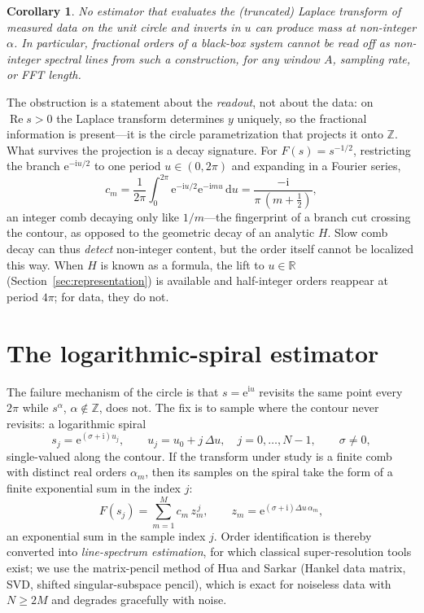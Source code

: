 \documentclass[11pt, a4paper]{article}
\newtheorem{corollary}[theorem]{Corollary}
\theoremstyle{definition}
\theoremstyle{remark}
\newcommand{\R}{\mathbb{R}}
\newcommand{\Z}{\mathbb{Z}}
\newcommand{\dd}{\,\mathrm{d}}
\newcommand{\ii}{\mathrm{i}}
\newcommand{\ee}{\mathrm{e}}
\begin{document}
\begin{corollary}\label{cor:blind}
No estimator that evaluates the (truncated) Laplace transform of measured
data on the unit circle and inverts in $u$ can produce mass at non-integer
$\alpha$. In particular, fractional orders of a black-box system cannot be
read off as non-integer spectral lines from such a construction, for any
window $A$, sampling rate, or FFT length.
\end{corollary}

The obstruction is a statement about the \emph{readout}, not about the
data: on $\operatorname{Re}s>0$ the Laplace transform determines $y$
uniquely, so the fractional information is present---it is the circle
parametrization that projects it onto $\Z$. What survives the projection is
a decay signature. For $F(s)=s^{-1/2}$, restricting the branch
$\ee^{-\ii u/2}$ to one period $u\in(0,2\pi)$ and expanding in a Fourier
series,
\begin{equation}\label{eq:branchsignature}
c_m=\frac{1}{2\pi}\int_0^{2\pi}\ee^{-\ii u/2}\ee^{-\ii mu} \dd u
=\frac{-\ii}{\pi\, (m+\tfrac12)} ,
\end{equation}
an integer comb decaying only like $1/m$---the fingerprint of a branch cut
crossing the contour, as opposed to the geometric decay of an analytic
$H$. Slow comb decay can thus \emph{detect} non-integer content, but the
order itself cannot be localized this way. When $H$ is known as a formula,
the lift to $u\in\R$ (Section~\ref{sec:representation}) is available and
half-integer orders reappear at period $4\pi$; for data, they do not.

\section{The logarithmic-spiral estimator}\label{sec:spiral}

The failure mechanism of the circle is that $s=\ee^{\ii u}$ revisits the
same point every $2\pi$ while $s^{\alpha}$, $\alpha\notin\Z$, does not.
The fix is to sample where the contour never revisits: a logarithmic
spiral
\begin{equation}\label{eq:spiral}
s_j=\ee^{(\sigma+\ii)u_j}, \qquad u_j=u_0+j\, \Delta u, \quad j=0, \dots,N-1,
\qquad \sigma\neq0 ,
\end{equation}
single-valued along the contour. If the transform under study is a finite
comb with distinct real orders $\alpha_m$, then its samples on the spiral
take the form of a finite exponential sum in the index $j$:
\begin{equation}\label{eq:expsum}
F(s_j) = \sum_{m=1}^{M} c_m\, z_m^{\,j}, \qquad
z_m=\ee^{(\sigma+\ii) \Delta u\, \alpha_m} ,
\end{equation}
an exponential sum in the sample index $j$. Order identification is
thereby converted into \emph{line-spectrum estimation}, for which
classical super-resolution tools exist; we use the matrix-pencil method of
Hua and Sarkar \cite{HuaSarkar1990} (Hankel data matrix, SVD, shifted
singular-subspace pencil), which is exact for noiseless data with
$N\ge2M$ and degrades gracefully with noise.
\end{document}
